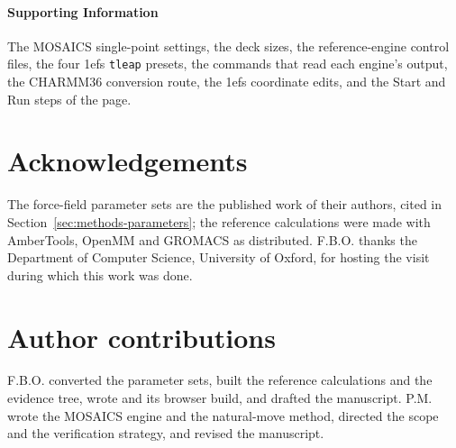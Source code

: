 \paragraph{Supporting Information}
The MOSAICS single-point settings, the deck sizes, the reference-engine control
files, the four 1efs \texttt{tleap} presets, the commands that read each
engine's output, the CHARMM36 conversion route, the 1efs coordinate edits, and
the Start and Run steps of the page.

\section*{Acknowledgements}
The force-field parameter sets are the published work of their authors, cited
in Section~\ref{sec:methods-parameters}; the reference calculations were made
with AmberTools, OpenMM and GROMACS as distributed. F.B.O. thanks the
Department of Computer Science, University of Oxford, for hosting the visit
during which this work was done.

\section*{Author contributions}
F.B.O. converted the parameter sets, built the reference calculations and the
evidence tree, wrote \studio{} and its browser build, and drafted the
manuscript. P.M. wrote the
MOSAICS engine and the natural-move method, directed the scope and the
verification strategy, and revised the manuscript.
